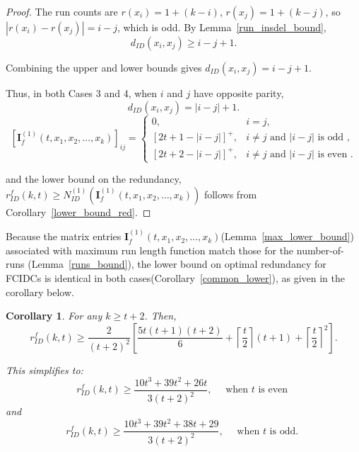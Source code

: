 \documentclass[11 pt]{article}
\numberwithin{equation}{section}
\newtheorem{corollary}[theorem]{Corollary}
\begin{document}
\begin{proof}
    The run counts are $r(x_i)=1+(k-i)$, $r(x_j)=1+(k-j)$, so $|r(x_i)-r(x_j)| = i-j$, which is odd. 
    By Lemma~\ref{run_insdel_bound},
    \[
    d_{ID}(x_i,x_j) \ge i - j + 1.
    \]

    \noindent
    Combining the upper and lower bounds gives $d_{ID}(x_i,x_j) = i - j + 1$.


    \noindent
    Thus, in both Cases 3 and 4, when $i$ and $j$ have opposite parity,  
    \[
        d_{ID}(x_i, x_j) = |i - j| + 1.
    \]
    \[
            [\boldsymbol{I}_f^{(1)}(t, x_1, x_2, \ldots, x_k)]_{ij}=
            \begin{cases}
                0,  & i = j, \\[4pt]
                [2t + 1 - |i - j|]^+ , & i \neq j \text{ and } |i-j| \text{ is odd },\\
                [2t + 2 - |i-j|]^+,    & i \neq j \text{ and } |i-j| \text{ is even }. 
            \end{cases}
        \]
        
        and the lower bound on the redundancy, $r_{ID}^f(k,t) \geq N_{ID}^{(1)}(\boldsymbol{I}_f^{(1)}(t, x_1, x_2, \ldots, x_k))$ follows from Corollary~\ref{lower_bound_red}.
    
    \end{proof}

    \noindent
    Because the matrix entries $\boldsymbol{I}_f^{(1)}(t, x_1, x_2, \ldots, x_k)$(Lemma~\ref{max_lower_bound}) associated with maximum run length function match those for the number-of-runs (Lemma~\ref{runs_bound}), the lower bound on optimal redundancy for FCIDCs is identical in both cases(Corollary~\ref{common_lower}), as given in the corollary below.
    
    \begin{corollary}
        For any $k \geq t+2$. Then,
        {
            \[
            r_{ID}^f(k,t) \geq \frac{2}{(t+2)^2}\left[\frac{5t(t+1)(t+2)}{6} + \left \lceil\frac{t}{2} \right \rceil (t+1) + \left \lceil\frac{t}{2} \right \rceil^2\right].
            \]
        }
        
        This simplifies to:
        $$\displaystyle r_{ID}^f(k,t) \geq \frac{10t^3 + 39t^2 + 26t}{3(t+2)^2}, \quad \text{ when $t$ is even }$$
        and $$\displaystyle r_{ID}^f(k,t) \geq \frac{10t^3 + 39t^2 + 38t + 29}{3(t+2)^2}, \quad \text{ when $t$ is odd. }$$ 
    \end{corollary}

    
\end{document}
